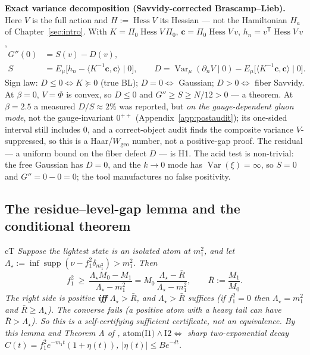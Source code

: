 \textbf{Exact variance decomposition (Savvidy-corrected Brascamp--Lieb).} Here $V$ is the full
action and $H:=\operatorname{Hess}V$ its Hessian --- not the Hamiltonian $H_a$ of
Chapter~\ref{sec:intro}. With $K=\Pi_0\operatorname{Hess}V\,\Pi_0$,
$\mathbf{c}=\Pi_0\operatorname{Hess}V\,v$, $h_n=v^{\mathsf T}\operatorname{Hess}V\,v$,
\begin{equation}
\begin{aligned}
G''(0)&=S(v)-D(v),\\
S&=E_\mu\bigl[h_n-\langle K^{-1}\mathbf{c},\mathbf{c}\rangle\mid0\bigr],\qquad
D=\operatorname{Var}_\mu(\partial_nV\mid0)-E_\mu\bigl[\langle K^{-1}\mathbf{c},\mathbf{c}\rangle\mid0\bigr].
\end{aligned}
\label{eq:vardecomp}
\end{equation}
Sign law: $D\le0\iff K\succeq0$ (true BL); $D=0\iff$ Gaussian; $D>0\iff$ fiber Savvidy. At
$\beta=0$, $V=\Phi$ is convex, so $D\le0$ and $G''\ge S\ge N/12>0$ --- a theorem. \LE{} At
$\beta=2.5$ a measured $D/S\approx2\%$ was reported, but \emph{on the gauge-dependent gluon
mode}, not the gauge-invariant $0^{++}$ (Appendix~\ref{app:postaudit}); its one-sided interval
still includes $0$, and a correct-object audit finds the composite variance $V$-suppressed, so
this is a Haar/$W_{\mathrm{geo}}$ number, not a positive-gap proof. The residual --- a uniform
bound on the fiber defect $D$ --- is H1. The acid test is non-trivial: the free Gaussian has
$D=0$, and the $k\to0$ mode has $\operatorname{Var}(\xi)=\infty$, so $S=0$ and
$G''=0-0=0$; the tool manufactures no false positivity.

\subsection{The residue--level-gap lemma and the conditional theorem}
\label{sec:reslevel}


\begin{claimbox}{cT}
 \emph{Suppose the lightest state is an isolated atom at
$m_1^2$, and let $\Lambda_{\star}:=\inf\operatorname{supp}(\nu-f_1^2\delta_{m_1^2})>m_1^2$.
Then}
\begin{equation}
f_1^2\ \ge\ \frac{\Lambda_{\star} M_0-M_1}{\Lambda_{\star}-m_1^2}
= M_0\,\frac{\Lambda_{\star}-\bar R}{\Lambda_{\star}-m_1^2},
\qquad \bar R:=\frac{M_1}{M_0}.
\label{eq:reslevel}
\end{equation}
\emph{The right side is positive \textbf{iff} $\Lambda_{\star}>\bar R$, and $\Lambda_{\star}>\bar
R$ suffices (if $f_1^2=0$ then $\Lambda_{\star}=m_1^2$ and $\bar R\ge\Lambda_{\star}$). The
converse fails (a positive atom with a heavy tail can have $\bar R>\Lambda_{\star}$). So this is
a self-certifying sufficient certificate, not an equivalence. By this lemma and Theorem A of
, $\text{atom(I1)}\wedge\text{I2}\iff$ sharp two-exponential decay
$C(t)=f_1^2e^{-m_1t}(1+\eta(t))$, $|\eta(t)|\le Be^{-\delta t}$.}
\end{claimbox}

